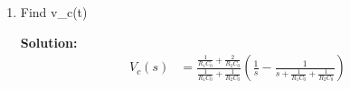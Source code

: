 \documentclass[journal,12pt,twocolumn]{IEEEtran}
\newcommand{\solution}{\noindent \textbf{Solution: }}
\providecommand{\brak}[1]{\ensuremath{\left(#1\right)}}
\providecommand{\system}[1]{\overset{\mathcal{#1}}{ \longleftrightarrow}}
\numberwithin{equation}{section}
\numberwithin{figure}{section}
\renewcommand\thesection{\arabic{section}}
\begin{document}
\begin{enumerate}[label=\thesection.\arabic*.,ref=\thesection.\theenumi]
	where 
	\begin{align}
		u(t) \system{L} V_1(s) \\
		2u(t) \system{L} V_2(s)
	\end{align}
	Find the voltage across the capacitor $V_{C_0}(s)$
	
	\solution 
	\begin{align}
		V_1(s) &= \frac{1}{s} &&\Re(s) > 0 \\
		V_2(s) &= \frac{2}{s} &&\Re(s) > 0 
	\end{align}		
		
	By Kirchoff's junction law, we get
	\begin{align}
		&\frac{V_c - V_1}{R_1} + 	\frac{V_c - V_2}{R_2} + \frac{V_c - 0}{\frac{1}{sC_0}} = 0 \\
		\implies &V_c \brak{\frac{1}{R_1} + \frac{1}{R_2} + sC_0} = \frac{V_1}{R_1} + \frac{V_2}{R_2} \\
		\implies &V_c(s) = \frac{\frac{1}{sR_1} + \frac{2}{sR_2}}{\frac{1}{R_1} + \frac{1}{R_2} + sC_0} \\
		&\qquad = \frac{\frac{1}{R_1C_0} + \frac{2}{R_2C_0}}{s\brak{s + \frac{1}{R_1C_0} + \frac{1}{R_2C_0}}} 
	\end{align}
	
	\item Find v_c(t)

	\solution 
	\begin{align} 
		V_c(s) &=  \frac{\frac{1}{R_1C_0} + \frac{2}{R_2C_0}}{\frac{1}{R_1C_0} + \frac{1}{R_2C_0}} \brak{\frac{1}{s} - \frac{1}{s + \frac{1}{R_1C_0} + \frac{1}{R_2C_0}}} 
	\end{align}
	
	
	\end{enumerate}
	
\end{document}
